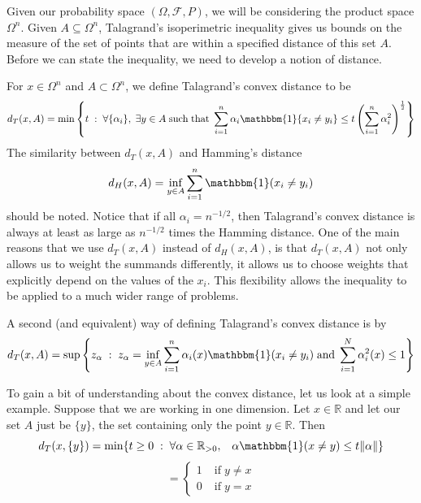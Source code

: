 \documentclass[12pt]{report}
\theoremstyle{definition}
\begin{document}
Given our probability space $(\Omega,\mathcal{F},P)$, we will be considering the product space $\Omega^n$.  Given $A\subseteq\Omega^n$, Talagrand's isoperimetric inequality gives us bounds on the measure of the set of points that are within a specified distance of this set $A$.  Before we can state the inequality, we need to develop a notion of distance. 

For $x\in\Omega^n$ and $A\subset\Omega^n$, we define Talagrand's convex distance to be 
$$
d_T(x,A)=\min\left\{ t \; : \;\forall \{\alpha_i\}, \;\exists y\in A \;\mathrm{such}\;\mathrm{that}\; \sum_{i=1}^n \alpha_i
\mathbbm{1}\{x_i\not = y_i\}\leq t\left(\sum_{i=1}^n \alpha_i ^2 \right)^{\frac{1}{2}}\right\}
$$
The similarity between $d_T(x,A)$ and Hamming's distance 
$$
d_H(x,A)=\inf_{y\in A} \sum_{i=1}^n \mathbbm{1}(x_i\not = y_i)
$$
should be noted.  Notice that if all $\alpha_i=n^{-1/2}$, then Talagrand's convex distance is always at least as large as $n^{-1/2}$ times the Hamming distance.  One of the main reasons that we use $d_T(x,A)$ instead of $d_H(x,A)$, is that $d_T(x,A)$ not only allows us to weight the summands differently, it allows us to choose weights that explicitly depend on the values of the $x_i$.  This flexibility allows the inequality to be applied to a much wider range of problems.

A second (and equivalent) way of defining Talagrand's convex distance is by 
\begin{equation}
\label{conv}
d_T(x,A)=\sup\left\{z_{\alpha}\; : \;z_{\alpha}=\inf_{y\in A}\sum_{i=1}^n \alpha_i(x)\mathbbm{1}(x_i\not = y_i) \;\mathrm{and}\; \sum_{i=1}^N\alpha_i^2(x)\leq 1\right\}
\end{equation} 

To gain a bit of understanding about the convex distance, let us look at a simple example.  Suppose that we are working in one dimension.  Let $x\in\mathbb{R}$ and let our set $A$ just be $\{y\}$, the set containing only the point $y\in\mathbb{R}$.  Then 
$$
d_T(x,\{y\})=\min\{t\geq 0\; : \; \forall \alpha\in\mathbb{R}_{>0}, \; \; \; \alpha\mathbbm{1}(x\not = y)\leq t\|\alpha\|\}
$$  
$$
=\left\{
     \begin{array}{lr}
       1 & \;\mathrm{if}\; y\not = x\\
       0 & \;\mathrm{if}\; y=x
     \end{array}
   \right.
$$
\end{document}
